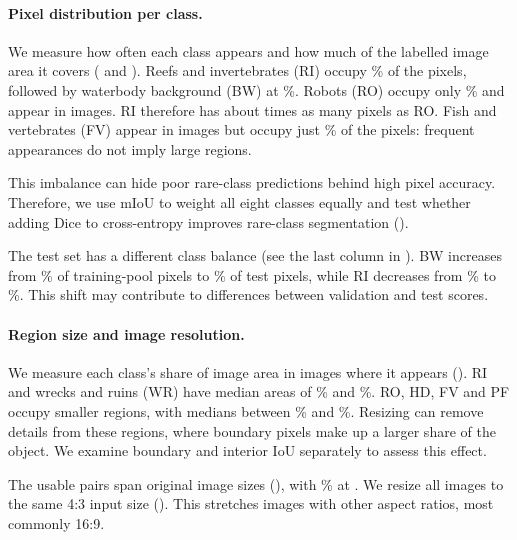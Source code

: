 \paragraph{Pixel distribution per class.}
We measure how often each class appears and how much of the labelled image
area it covers ( and
). Reefs and invertebrates (RI) occupy
\suimShareTrainValRI\% of the pixels, followed by waterbody background (BW) at
\suimShareTrainValBW\%. Robots (RO) occupy only \suimShareTrainValRO\% and
appear in \suimImagesTrainValRO{} images. RI therefore has about
\suimImbalanceRatio{} times as many pixels as RO. Fish and vertebrates (FV)
appear in \suimImagesTrainValFV{} images but occupy just
\suimShareTrainValFV\% of the pixels: frequent appearances do not imply large
regions.

This imbalance can hide poor rare-class predictions behind high pixel accuracy.
Therefore, we use mIoU to weight all eight classes equally and test whether adding Dice to
cross-entropy improves rare-class segmentation ().

The test set has a different class balance
(see the last column in ). BW increases from
\suimShareTrainValBW\% of training-pool pixels to \suimShareTestBW\% of test
pixels, while RI decreases from \suimShareTrainValRI\% to
\suimShareTestRI\%. This shift may contribute to differences between validation
and test scores.



\paragraph{Region size and image resolution.}
We measure each class's share of image area in images where it appears
(). RI and wrecks and ruins (WR) have median areas of
\suimMedianAreaRI\% and \suimMedianAreaWR\%. RO, HD, FV and PF occupy smaller
regions, with medians between \suimMedianAreaRO\% and
\suimMedianAreaPF\%. Resizing can remove details from these regions, where
boundary pixels make up a larger share of the object. We examine boundary and
interior IoU separately to assess this effect.

The usable pairs span \suimResolutionCount{} original image sizes
(), with \suimDominantResolutionShare\% at
\suimDominantResolution. We resize all images to the same 4:3 input size
(). This stretches images with other aspect ratios,
most commonly 16:9.

